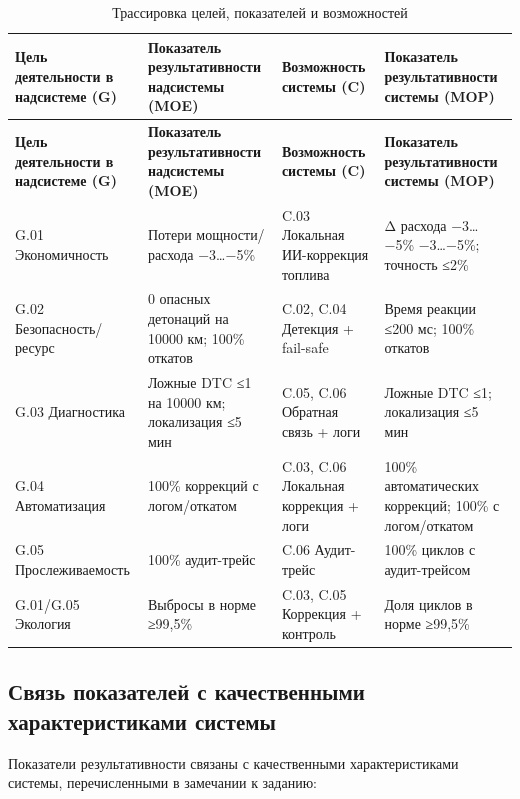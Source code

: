 \documentclass[14pt, a4paper]{extarticle}
\begin{document}
			\vspace{\parindent}
			
			\noindent
			\begin{xltabular}{\textwidth}{|L|L|L|L|}
				\caption{Трассировка целей, показателей и возможностей}\label{tab:t4}\\
				\hline
				\textbf{Цель деятельности в надсистеме (G)} & \textbf{Показатель результативности надсистемы (MOE)} & \textbf{Возможность системы (C)} & \textbf{Показатель результативности системы (MOP)} \\
				\hline
				\endfirsthead
				\hline
				\textbf{Цель деятельности в надсистеме (G)} & \textbf{Показатель результативности надсистемы (MOE)} & \textbf{Возможность системы (C)} & \textbf{Показатель результативности системы (MOP)} \\
				\hline
				\endhead
				\hline
				\endfoot
				\hline
				\endlastfoot
				G.01 Экономичность & Потери мощности/расхода −3…−5\% & C.03 Локальная ИИ-коррекция топлива & Δ расхода −3…−5\% −3…−5\%; точность ≤2\% \\
				\hline
				G.02 Безопасность/ресурс & 0 опасных детонаций на 10000 км; 100\% откатов & C.02, C.04 Детекция + fail-safe & Время реакции ≤200 мс; 100\% откатов \\
				\hline
				G.03 Диагностика & Ложные DTC ≤1 на 10000 км; локализация ≤5 мин & C.05, C.06 Обратная связь + логи & Ложные DTC ≤1; локализация ≤5 мин \\
				\hline
				G.04 Автоматизация & 100\% коррекций с логом/откатом & C.03, C.06 Локальная коррекция + логи & 100\% автоматических коррекций; 100\% с логом/откатом \\
				\hline
				G.05 Прослеживаемость & 100\% аудит-трейс & C.06 Аудит-трейс & 100\% циклов с аудит-трейсом \\
				\hline
				G.01/G.05 Экология & Выбросы в норме ≥99,5\% & C.03, C.05 Коррекция + контроль & Доля циклов в норме ≥99,5\% \\
				\hline
			\end{xltabular}
			
			\vspace{\parindent}
			
			
			\subsection{Связь показателей с качественными характеристиками системы}
			
				Показатели результативности связаны с качественными характеристиками системы, перечисленными в замечании к заданию:
				
\end{document}
